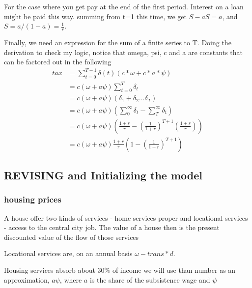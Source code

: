 For  the case where you get pay at the end of the first period. Interest on a loan  might be paid this way.  summing from t=1 this time, we get $S-aS =a$, and $S = a/(1-a)= \frac{1}{r}$. 

 


Finally, we need an expression for the sum of a finite  series to T.  Doing the derivation to check my logic, notice that  omega, psi, c  and a are constants that can be factored out in the following
\begin{align}%
    tax&= \sum_{t=0}^{T-1} \delta(t) \left(c*\omega + c*a*\psi \right)\\
        &= c(\omega + a\psi)\sum_{t=0}^T  \delta_t\\
        &= c(\omega + a\psi)(\delta_1+\delta_2 \dots \delta_T)\\
        &= c(\omega + a\psi) \left(\sum_0^\infty \delta_t-\sum_{T}^\infty \delta_t\right)\\
        &= c(\omega + a\psi) \left(\frac{1+r}{r}  - \left(\frac{1}{1+r}\right)^{T+1} \left(\frac{1+r}{r} \right) \right)\\
        &= c(\omega + a\psi) \frac{1+r}{r}\left(1  - \left(\frac{1}{1+r}\right)^{T+1} \right)
\end{align}




\newcommand{\ee}[1]{\color{red}#1 \color{black}}

\subsection{REVISING and  Initializing the model}
\subsubsection{housing prices}

A house offer two kinds of services - home services proper and locational services - access to the central city job. The value of a house then is the present discounted value of the flow of those services

Locational services are, on an annual basis $\omega- trans * d$.

Housing services absorb about 30\% of income  we will use than number  as an approximation,  $a\psi$, where $a$ is the share of the subsistence wage and $\psi$


